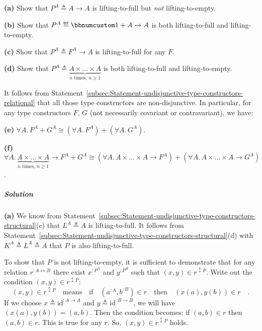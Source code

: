 \textbf{(a)} Show that $P^{A}\triangleq A\rightarrow A$ is lifting-to-full
but \emph{not} lifting-to-empty.

\textbf{(b)} Show that $P^{A}\triangleq\bbnum 1+A\rightarrow A$ is
both lifting-to-full and lifting-to-empty.

\textbf{(c)} Show that $P^{A}\triangleq F^{A}\rightarrow A$ is lifting-to-full
for any $F$.

\textbf{(d)} Show that $P^{A}\triangleq\underbrace{A\times...\times A}_{n\text{ times, }n\geq1}$
is both lifting-to-full and lifting-to-empty.

It follows from Statement~\ref{subsec:Statement-undisjunctive-type-constructors-relational}
that all those type constructors are non-disjunctive. In particular,
for any type constructors $F$, $G$ (not necessarily covariant or
contravariant), we have:

\textbf{(e)} $\forall A.\,F^{A}+G^{A}\cong(\forall A.\,F^{A})+(\forall A.\,G^{A})$.

\textbf{(f)} $\forall A.\,\underbrace{A\times...\times A}_{n\text{ times, }n\geq1}\rightarrow F^{A}+G^{A}\cong(\forall A.\,A\times...\times A\rightarrow F^{A})+(\forall A.\,A\times...\times A\rightarrow G^{A})$.

\subparagraph{Solution}

\textbf{(a)} We know from Statement~\ref{subsec:Statement-undisjunctive-type-constructors-structural}(c)
that $L^{A}\triangleq A$ is lifting-to-full. It follows from Statement~\ref{subsec:Statement-undisjunctive-type-constructors-structural}(d)
with $K^{A}\triangleq L^{A}\triangleq A$ that $P$ is also lifting-to-full.

To show that $P$ is not lifting-to-empty, it is sufficient to demonstrate
that for any relation $r^{:A\leftrightarrow B}$ there exist $x^{:P^{A}}$
and $y^{:P^{B}}$ such that $(x,y)\in r^{\updownarrow P}$. Write
out the condition $(x,y)\in r^{\updownarrow P}$:
\[
(x,y)\in r^{\updownarrow P}\quad\text{means}\quad\text{if}\quad(a^{:A},b^{:B})\in r\quad\text{then}\quad(x(a),y(b))\in r\quad.
\]
If we choose $x\triangleq\text{id}^{:A\rightarrow A}$ and $y\triangleq\text{id}^{:B\rightarrow B}$,
we will have $(x(a),y(b))=(a,b)$. Then the condition becomes: if
$(a,b)\in r$ then $(a,b)\in r$. This is true for any $r$. So, $(x,y)\in r^{\updownarrow P}$
holds.

